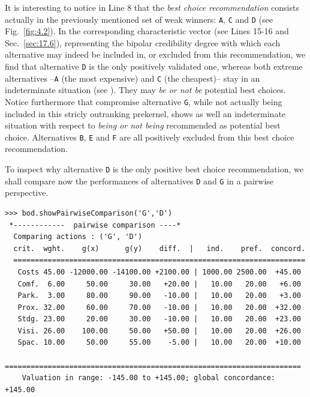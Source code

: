 It is interesting to notice in Line 8 that the \Rubis \emph{best choice recommendation} consists actually in the previously mentioned set of weak \Condorcet winners: \texttt{A}, \texttt{C} and \texttt{D} (see Fig.~\vref{fig:4.2}). In the corresponding characteristic vector (see Lines 15-16 and Sec.~\vref{sec:17.6}), representing the bipolar credibility degree with which each alternative may indeed be included in, or excluded from this recommendation, we find that alternative \texttt{D} is the only positively validated one, whereas both extreme alternatives --\texttt{A} (the most expensive) and \texttt{C} (the cheapest)-- stay in an indeterminate situation (see \citet{BIS-2006a,BIS-2006b}). They may \emph{be or not be} potential best choices. Notice furthermore that compromise alternative \texttt{G}, while not actually being included in this stricly outranking prekernel, shows as well an indeterminate situation with respect to \emph{being or not being} recommended as potential best choice. Alternatives \texttt{B}, \texttt{E} and \texttt{F} are all positively excluded from this best choice recommendation.

To inspect why alternative \texttt{D} is the only positive best choice recommendation, we shall compare now the performances of alternatives \texttt{D} and \texttt{G} in a pairwise perspective.
\begin{lstlisting}[caption={Inspecting pairwise comparison between alternatives \texttt{G} and \texttt{D}},label=list:4.5,basicstyle=\ttfamily\scriptsize]
>>> bod.showPairwiseComparison('G','D')
 *------------  pairwise comparison ----*
  Comparing actions : ('G', 'D')
  crit.  wght.    g(x)      g(y)    diff.  |   ind.    pref.  concord. 
  ====================================================================
   Costs 45.00 -12000.00 -14100.00 +2100.00 | 1000.00 2500.00  +45.00  
   Comf.  6.00     50.00     30.00   +20.00 |   10.00   20.00   +6.00 
   Park.  3.00     80.00     90.00   -10.00 |   10.00   20.00   +3.00 
   Prox. 32.00     60.00     70.00   -10.00 |   10.00   20.00  +32.00 
   Stdg. 23.00     20.00     30.00   -10.00 |   10.00   20.00  +23.00 
   Visi. 26.00    100.00     50.00   +50.00 |   10.00   20.00  +26.00 
   Spac. 10.00     50.00     55.00    -5.00 |   10.00   20.00  +10.00
   =====================================================================
    Valuation in range: -145.00 to +145.00; global concordance: +145.00
\end{lstlisting}

